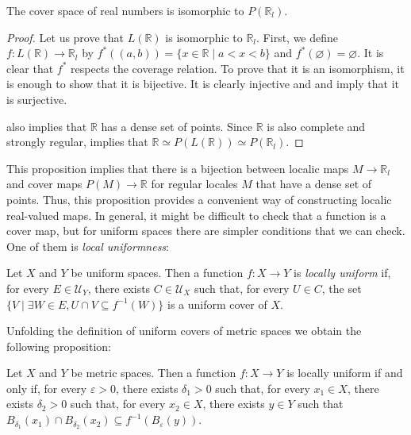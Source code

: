 \documentclass[reqno]{amsart}
\theoremstyle{definition}
\theoremstyle{remark}
\numberwithin{figure}{section}
\begin{document}
\begin{prop}
The cover space of real numbers is isomorphic to $P(\mathbb{R}_l)$.
\end{prop}
\begin{proof}
Let us prove that $L(\mathbb{R})$ is isomorphic to $\mathbb{R}_l$.
First, we define $f : L(\mathbb{R}) \to \mathbb{R}_l$ by $f^*((a,b)) = \{ x \in \mathbb{R} \mid a < x < b \}$ and $f^*(\varnothing) = \varnothing$.
It is clear that $f^*$ respects the coverage relation.
To prove that it is an isomorphism, it is enough to show that it is bijective.
It is clearly injective and  and  imply that it is surjective.

 also implies that $\mathbb{R}$ has a dense set of points.
Since $\mathbb{R}$ is also complete and strongly regular,  implies that $\mathbb{R} \simeq P(L(\mathbb{R})) \simeq P(\mathbb{R}_l)$.
\end{proof}

This proposition implies that there is a bijection between localic maps $M \to \mathbb{R}_l$ and cover maps $P(M) \to \mathbb{R}$ for regular locales $M$ that have a dense set of points.
Thus, this proposition provides a convenient way of constructing localic real-valued maps.
In general, it might be difficult to check that a function is a cover map, but for uniform spaces there are simpler conditions that we can check.
One of them is \emph{local uniformness}:

\begin{defn}
Let $X$ and $Y$ be uniform spaces.
Then a function $f : X \to Y$ is \emph{locally uniform} if, for every $E \in \mathcal{U}_Y$, there exists $C \in \mathcal{U}_X$ such that, for every $U \in C$, the set $\{ V \mid \exists W \in E, U \cap V \subseteq f^{-1}(W) \}$ is a uniform cover of $X$.
\end{defn}

Unfolding the definition of uniform covers of metric spaces we obtain the following proposition:

\begin{prop}
Let $X$ and $Y$ be metric spaces.
Then a function $f : X \to Y$ is locally uniform if and only if, for every $\varepsilon > 0$, there exists $\delta_1 > 0$ such that,
for every $x_1 \in X$, there exists $\delta_2 > 0$ such that, for every $x_2 \in X$, there exists $y \in Y$ such that $B_{\delta_1}(x_1) \cap B_{\delta_2}(x_2) \subseteq f^{-1}(B_\varepsilon(y))$.
\end{prop}
\end{document}
